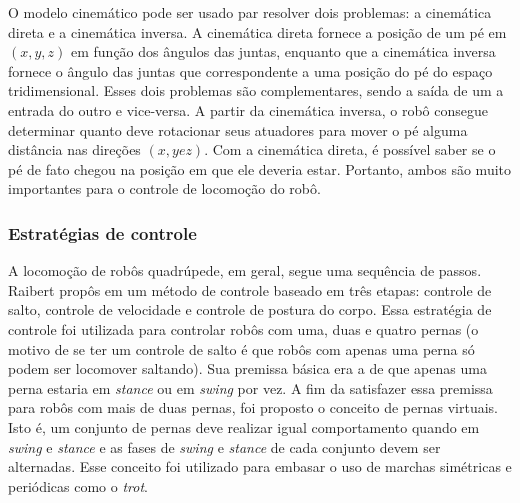 \documentclass[../main.tex]{subfiles}
\begin{document}
O modelo cinemático pode ser usado par resolver dois problemas: a cinemática direta e a cinemática inversa. A cinemática direta fornece a posição de um pé em $(x, y, z)$ em função dos ângulos das juntas, enquanto que a cinemática inversa fornece o ângulo das juntas que correspondente a uma posição do pé do espaço tridimensional. Esses dois problemas são complementares, sendo a saída de um a entrada do outro e vice-versa. A partir da cinemática inversa, o robô consegue determinar quanto deve rotacionar seus atuadores para mover o pé alguma distância nas direções $(x, y e z)$. Com a cinemática direta, é possível saber se o pé de fato chegou na posição em que ele deveria estar. Portanto, ambos são muito importantes para o controle de locomoção do robô.

\subsubsection{Estratégias de controle}
A locomoção de robôs quadrúpede, em geral, segue uma sequência de passos. Raibert propôs em \cite{Raibert1986} um método de controle baseado em três etapas: controle de salto, controle de velocidade e controle de postura do corpo. Essa estratégia de controle foi utilizada para controlar robôs com uma, duas e quatro pernas (o motivo de se ter um controle de salto é que robôs com apenas uma perna só podem ser locomover saltando). Sua premissa básica era a de que apenas uma perna estaria em \textit{stance} ou em \textit{swing} por vez. A fim da satisfazer essa premissa para robôs com mais de duas pernas, foi proposto o conceito de pernas virtuais. Isto é, um conjunto de pernas deve realizar igual comportamento quando em \textit{swing} e \textit{stance} e as fases de \textit{swing} e \textit{stance} de cada conjunto devem ser alternadas. Esse conceito foi utilizado para embasar o uso de marchas simétricas e periódicas como o \textit{trot}.
\end{document}
